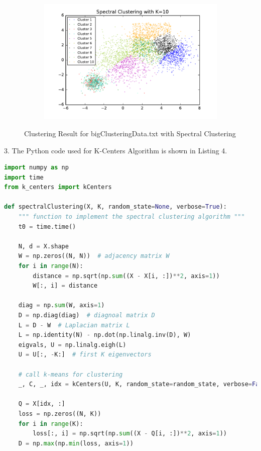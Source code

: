 \begin{description}
\begin{description}
\begin{figure}[!h]
\begin{subfigure}[b]{0.475\textwidth}
            \includegraphics[width=\textwidth]{./figures/bigClustering_spectral_10.pdf}
        \end{subfigure}
        
        \caption{Clustering Result for bigClusteringData.txt with Spectral Clustering}
        \label{fig:spectral_bigClustering}
\end{figure}

\newpage
\item{3.} The Python code used for K-Centers Algorithm is shown in Listing 4.

\begin{lstlisting}[language=Python, caption=Spectral Clustering Algorithm Python Code]
import numpy as np
import time
from k_centers import kCenters

def spectralClustering(X, K, random_state=None, verbose=True):
    """ function to implement the spectral clustering algorithm """
    t0 = time.time()

    N, d = X.shape
    W = np.zeros((N, N))  # adjacency matrix W
    for i in range(N):
        distance = np.sqrt(np.sum((X - X[i, :])**2, axis=1))
        W[:, i] = distance

    diag = np.sum(W, axis=1)
    D = np.diag(diag)  # diagnoal matrix D
    L = D - W  # Laplacian matrix L
    L = np.identity(N) - np.dot(np.linalg.inv(D), W)
    eigvals, U = np.linalg.eigh(L)
    U = U[:, -K:]  # first K eigenvectors

    # call k-means for clustering
    _, C, _, idx = kCenters(U, K, random_state=random_state, verbose=False)

    Q = X[idx, :]
    loss = np.zeros((N, K))
    for i in range(K):
        loss[:, i] = np.sqrt(np.sum((X - Q[i, :])**2, axis=1))
    D = np.max(np.min(loss, axis=1))


\end{lstlisting}
\end{description}
\end{description}
